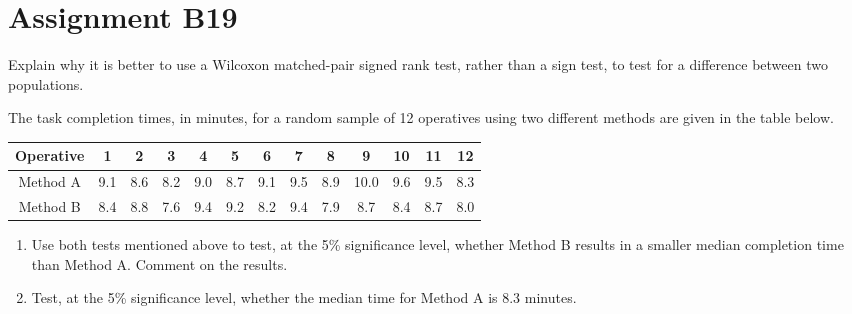 \section{Assignment B19}

\begin{problem}
    Explain why it is better to use a Wilcoxon matched-pair signed rank test, rather than a sign test, to test for a difference between two populations.

    The task completion times, in minutes, for a random sample of 12 operatives using two different methods are given in the table below.

    \begin{table}[H]
        \centering
        \begin{tabular}{|c|c|c|c|c|c|c|c|c|c|c|c|c|}
            \hline
            Operative & 1 & 2 & 3 & 4 & 5 & 6 & 7 & 8 & 9 & 10 & 11 & 12 \\ \hline
            Method A & 9.1 & 8.6 & 8.2 & 9.0 & 8.7 & 9.1 & 9.5 & 8.9 & 10.0 & 9.6 & 9.5 & 8.3 \\ \hline
            Method B & 8.4 & 8.8 & 7.6 & 9.4 & 9.2 & 8.2 & 9.4 & 7.9 & 8.7 & 8.4 & 8.7 & 8.0 \\ \hline
        \end{tabular}
    \end{table}

    \begin{enumerate}
        \item Use both tests mentioned above to test, at the 5\% significance level, whether Method B results in a smaller median completion time than Method A. Comment on the results.
        \item Test, at the 5\% significance level, whether the median time for Method A is 8.3 minutes.
    \end{enumerate}
\end{problem}
